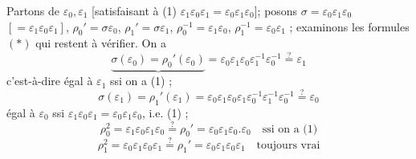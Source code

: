 \documentclass[11pt,a4paper]{article}
\begin{document}
Partons de $\varepsilon_0, \varepsilon_1$ [satisfaisant à (1) $\boxed{\varepsilon_1 \varepsilon_0 \varepsilon_1 = \varepsilon_0 \varepsilon_1 \varepsilon_0}$]; posons $\sigma = \varepsilon_0 \varepsilon_1 \varepsilon_0$ $[= \varepsilon_1 \varepsilon_0 \varepsilon_1]$, $\rho_0' = \sigma \varepsilon_0$, $\rho_1' = \sigma \varepsilon_1$, $\rho_0^{-1} = \varepsilon_1 \varepsilon_0$, $\rho_1^{-1} = \varepsilon_0 \varepsilon_1$ ;
 examinons les formules $(*)$ qui restent à vérifier. On a 
\[
\underbrace{\sigma(\varepsilon_0) = \rho_0'(\varepsilon_0)}
= \varepsilon_0 \varepsilon_1 \varepsilon_0 \varepsilon_1^{-1} \varepsilon_0^{-1}
\overset{?}{=} \varepsilon_1
\]
c'est-à-dire égal à $\varepsilon_1$ ssi  on a (1) ;
\[
\sigma(\varepsilon_1) = \rho_1'(\varepsilon_1)
= \varepsilon_0 \varepsilon_1 \varepsilon_0 \varepsilon_1 \varepsilon_0^{-1}
\varepsilon_1^{-1} \varepsilon_0^{-1} \overset{?}{=} \varepsilon_0
\]
égal à $\varepsilon_0$ ssi $\varepsilon_1 \varepsilon_0 \varepsilon_1 = \varepsilon_0 \varepsilon_1 \varepsilon_0$, i.e. (1) ;
\[
\rho_0^2 = \varepsilon_1 \varepsilon_0 \varepsilon_1 \varepsilon_0 \overset{?}{=} \rho_0'
= \varepsilon_0 \varepsilon_1 \varepsilon_0 . \varepsilon_0
\quad \text{ssi on a (1)}
\]
\[
\rho_1^2 = \varepsilon_0 \varepsilon_1 \varepsilon_0 \varepsilon_1 \overset{?}{=} \rho_1'
= \varepsilon_0 \varepsilon_1 \varepsilon_0 \varepsilon_1
\quad \text{toujours vrai}
\]
\end{document}
